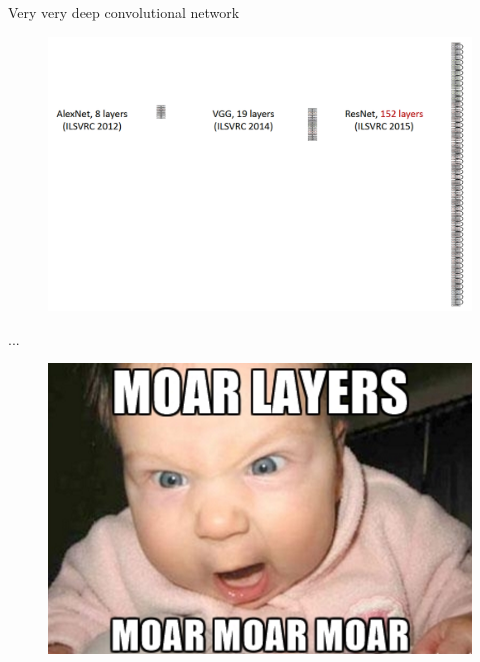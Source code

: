 \documentclass{beamer}
\begin{document}
\begin{frame}{Very very deep convolutional network}

\begin{figure}[h!]
  \centering
  \includegraphics[width=1\textwidth]{images/comp2.png}
\end{figure}

\end{frame}


\begin{frame}{...}

\begin{figure}[h!]
  \centering
  \includegraphics[width=1\textwidth]{images/moar.png}
\end{figure}

\end{frame}
\end{document}
